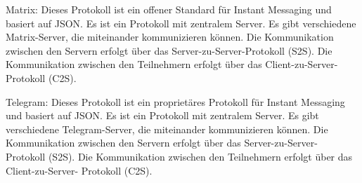 Matrix:
Dieses Protokoll ist ein offener Standard für Instant Messaging und basiert auf JSON. Es ist ein
Protokoll mit zentralem Server. Es gibt verschiedene Matrix-Server, die miteinander kommunizieren
können. Die Kommunikation zwischen den Servern erfolgt über das Server-zu-Server-Protokoll (S2S).
Die Kommunikation zwischen den Teilnehmern erfolgt über das Client-zu-Server-Protokoll (C2S).

Telegram:
Dieses Protokoll ist ein proprietäres Protokoll für Instant Messaging und basiert auf JSON. Es ist
ein Protokoll mit zentralem Server. Es gibt verschiedene Telegram-Server, die miteinander
kommunizieren können. Die Kommunikation zwischen den Servern erfolgt über das Server-zu-Server-
Protokoll (S2S). Die Kommunikation zwischen den Teilnehmern erfolgt über das Client-zu-Server-
Protokoll (C2S).
